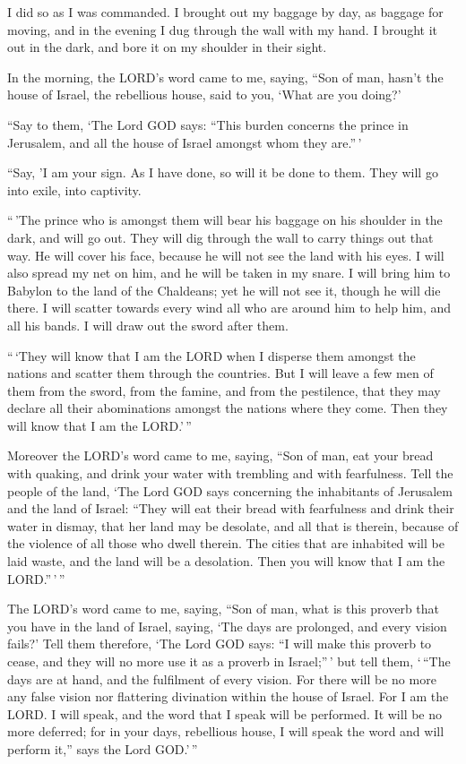  I did so as I was commanded. I brought out my baggage by
day, as baggage for moving, and in the evening I dug through the wall
with my hand. I brought it out in the dark, and bore it on my shoulder
in their sight.

 In the morning, the LORD's word came to me, saying,
 ``Son of man, hasn't the house of Israel, the rebellious
house, said to you, `What are you doing?'

 ``Say to them, `The Lord GOD says: ``This burden concerns
the prince in Jerusalem, and all the house of Israel amongst whom they
are.''\,'

 ``Say, 'I am your sign. As I have done, so will it be done
to them. They will go into exile, into captivity.

 ``\,'The prince who is amongst them will bear his baggage
on his shoulder in the dark, and will go out. They will dig through the
wall to carry things out that way. He will cover his face, because he
will not see the land with his eyes.  I will also spread my
net on him, and he will be taken in my snare. I will bring him to
Babylon to the land of the Chaldeans; yet he will not see it, though he
will die there.  I will scatter towards every wind all who
are around him to help him, and all his bands. I will draw out the sword
after them.

 ``\,`They will know that I am the LORD when I disperse
them amongst the nations and scatter them through the countries.
 But I will leave a few men of them from the sword, from
the famine, and from the pestilence, that they may declare all their
abominations amongst the nations where they come. Then they will know
that I am the LORD.'\,''

 Moreover the LORD's word came to me, saying, 
``Son of man, eat your bread with quaking, and drink your water with
trembling and with fearfulness.  Tell the people of the
land, `The Lord GOD says concerning the inhabitants of Jerusalem and the
land of Israel: ``They will eat their bread with fearfulness and drink
their water in dismay, that her land may be desolate, and all that is
therein, because of the violence of all those who dwell therein.
 The cities that are inhabited will be laid waste, and the
land will be a desolation. Then you will know that I am the
LORD.''\,'\,''

 The LORD's word came to me, saying,  ``Son of
man, what is this proverb that you have in the land of Israel, saying,
`The days are prolonged, and every vision fails?'  Tell
them therefore, `The Lord GOD says: ``I will make this proverb to cease,
and they will no more use it as a proverb in Israel;''\,' but tell them,
`\,``The days are at hand, and the fulfilment of every vision.
 For there will be no more any false vision nor flattering
divination within the house of Israel.  For I am the LORD.
I will speak, and the word that I speak will be performed. It will be no
more deferred; for in your days, rebellious house, I will speak the word
and will perform it,'' says the Lord GOD.'\,''

